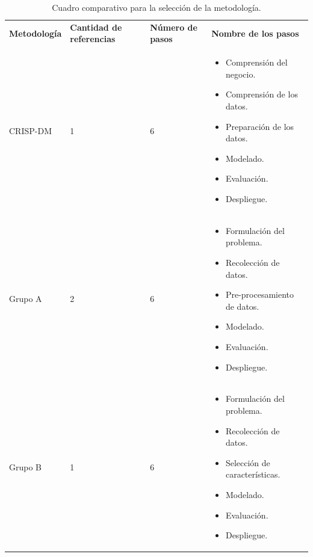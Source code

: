 \begingroup
	\renewcommand\arraystretch{0.3}
	\begin{longtable}{|M{3cm}|M{2.5cm}|M{2.5cm}|M{6cm}|}
		\caption[Cuadro comparativo para la selección de la metodología]{Cuadro comparativo para la selección de la metodología.}
		\label{3:table2}
		\newcommand{\multirot}[1]{\multirow{2}{*}[-8ex]{\rotcell{\rlap{#1}}}}
		\footnotesize
		\centering
		\small
		\tabularnewline\hline
		\textbf{Metodología} & \textbf{Cantidad de referencias} & \textbf{Número de pasos} & \textbf{Nombre de los pasos}
		\\
		\hline
		{CRISP-DM}
		& 1
		& 6
		& 
		\begin{itemize}[noitemsep,leftmargin=*]
			\item Comprensión del negocio.
			\item Comprensión de los datos.
			\item Preparación de los datos.
			\item Modelado.
			\item Evaluación.
			\item Despliegue.
		\end{itemize}                                                 
		\\
		\hline
		{Grupo A}
		& 2
		& 6
		& 
		\begin{itemize}[noitemsep,leftmargin=*]
			\item Formulación del problema.
			\item Recolección de datos.
			\item Pre-procesamiento de datos.
			\item Modelado.
			\item Evaluación.
			\item Despliegue.
		\end{itemize} 
		\\
		\hline
		{Grupo B}
		& 1
		& 6
		& 
		\begin{itemize}[noitemsep,leftmargin=*]
			\item Formulación del problema.
			\item Recolección de datos.
			\item Selección de características.
			\item Modelado.
			\item Evaluación.
			\item Despliegue.
		\end{itemize} 

\end{longtable}
